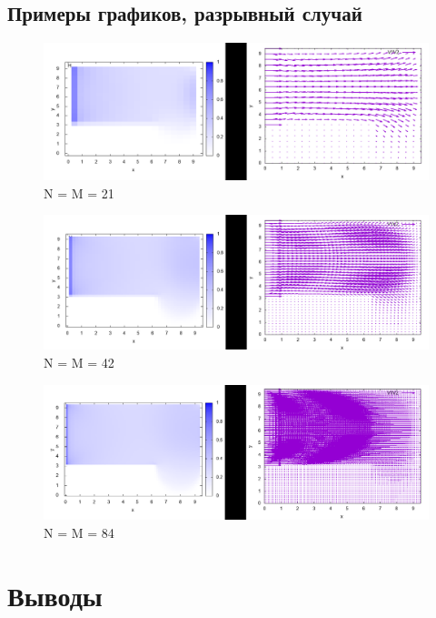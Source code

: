 \documentclass[a4paper,11pt]{article}
\begin{document}
\subsection{Примеры графиков, разрывный случай}
\begin{figure}[H]
\centering
\includegraphics[width=1.0\textwidth]{discont_21.png}
\caption{N = M = 21}
\end{figure}
\begin{figure}[H]
\centering
\includegraphics[width=1.0\textwidth]{discont_42.png}
\caption{N = M = 42}
\end{figure}
\begin{figure}[H]
\centering
\includegraphics[width=1.0\textwidth]{discont_84.png}
\caption{N = M = 84}
\end{figure}

\section{Выводы}
\end{document}
